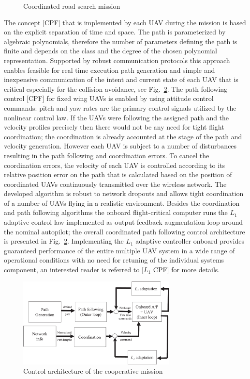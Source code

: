 \documentclass[letterpaper, 10 pt, conference]{ieeeconf}  %
\begin{document}
   \begin{figure}[thpb]
      \centering
      \caption{Coordinated road search mission}
      \label{CPF_concept}
   \end{figure}

The concept [CPF] that is implemented by each UAV during the mission is based on the explicit separation of time and space. The  path is parameterized by algebraic polynomials, therefore the number of parameters defining the path is finite and depends on the class and the degree of the chosen polynomial representation. Supported by robust communication protocols this approach enables feasible for real time execution path generation and simple and inexpensive communication of the intent and current state of each UAV that is critical especially for the collision avoidance, see Fig.~\ref{fig:CPF}. The path following control [CPF] for fixed wing UAVs is enabled by using attitude control commands: pitch and yaw rates are the primary control signals utilized by the nonlinear control law. If the UAVs were following the assigned path and the velocity profiles precisely then there would not be any need for tight flight coordination; the coordination is already accounted at the stage of the path and velocity generation. However each UAV is subject to a number of disturbances resulting in the path following and coordination errors. To cancel the coordination errors, the  velocity of each UAV is controlled according to its relative position error on the path that is calculated based on the position of coordinated UAVs continuously transmitted over the wireless network. The developed algorithm is robust to network dropouts and allows tight coordination of a number of UAVs flying in a realistic environment. Besides the coordination and path following algorithms the onboard flight-critical computer runs the  $L_1$ adaptive control law implemented as output feedback augmentation loop around the nominal autopilot; the overall coordinated path following control architecture is presented in Fig.~\ref{fig:CPF}.  Implementing the $L_1$ adaptive controller onboard provides guaranteed performance of the entire multiple UAV system in a wide range of operational conditions with no need for retuning of the individual systems component, an interested reader is referred to [$L_1$ CPF] for more details.

   \begin{figure}[thpb]
      \centering
      \includegraphics[width=80mm]{Pictures/Figure_04.pdf}
      \caption{Control architecture of the cooperative mission}
      \label{fig:CPF}
   \end{figure}
\end{document}
